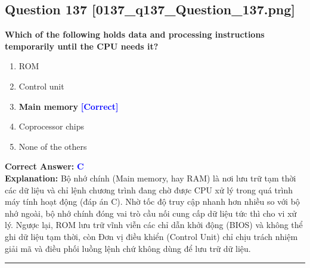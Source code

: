 \documentclass[11pt,a4paper]{article}
\begin{document}
\begin{minipage}{\textwidth}
\subsection*{Question 137 \quad \footnotesize{[0137\_q137\_Question\_137.png]}}
\noindent \textbf{Which of the following holds data and processing instructions temporarily until the CPU needs it?}

\begin{enumerate}[label=\Alph*.]
    \item ROM
    \item Control unit
    \item \textbf{Main memory} \hfill \textcolor{blue}{\textbf{[Correct]}}
    \item Coprocessor chips
    \item None of the others
\end{enumerate}

\noindent \textbf{Correct Answer:} \textcolor{blue}{\textbf{C}} \\[2pt]
\noindent \textbf{Explanation:} Bộ nhớ chính (Main memory, hay RAM) là nơi lưu trữ tạm thời các dữ liệu và chỉ lệnh chương trình đang chờ được CPU xử lý trong quá trình máy tính hoạt động (đáp án C). Nhờ tốc độ truy cập nhanh hơn nhiều so với bộ nhớ ngoài, bộ nhớ chính đóng vai trò cầu nối cung cấp dữ liệu tức thì cho vi xử lý. Ngược lại, ROM lưu trữ vĩnh viễn các chỉ dẫn khởi động (BIOS) và không thể ghi dữ liệu tạm thời, còn Đơn vị điều khiển (Control Unit) chỉ chịu trách nhiệm giải mã và điều phối luồng lệnh chứ không dùng để lưu trữ dữ liệu.

\par\vspace{0.3cm}
\hrule
\vspace{0.3cm}
\end{minipage}
\end{document}
